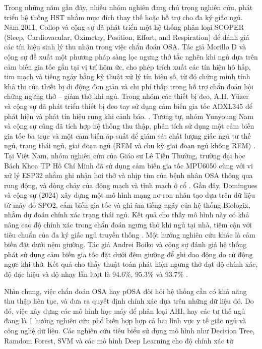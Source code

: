 Trong những năm gần đây, nhiều nhóm nghiên đang chú trọng nghiên cứu, phát triển hệ thống HST nhằm mục đích thay thế hoặc hỗ trợ cho đa ký giấc ngủ. Năm 2011, Collop và cộng sự đã phát triển một hệ thống phân loại SCOPER (Sleep, Cardiovacular, Oximetry, Position, Effort, and Respiration) để đánh giá các tín hiệu sinh lý thu nhận trong việc chẩn đoán OSA\cite{hst_6p_paper}. Tác giả Morillo D và cộng sự đề xuất một phương pháp sàng lọc ngưng thở tắc nghẽn khi ngủ dựa trên cảm biến gia tốc gắn tại vị trí hõm ức, cho phép trích xuất các tín hiệu hô hấp, tim mạch và tiếng ngáy bằng kỹ thuật xử lý tín hiệu số, từ đó chứng minh tính khả thi của thiết bị di động đơn giản và chi phí thấp trong hỗ trợ chẩn đoán hội chứng ngưng thở – giảm thở khi ngủ\cite{morillo2010accelerometer}. Trong nhóm các thiết bị đeo, A.H. Yüzer và cộng sự đã phát triển thiết bị đeo tay sử dụng cảm biến gia tốc ADXL345 để phát hiện và phát tín hiệu rung khi cảnh báo. \cite{hst_wear_paper}. Tương tự, nhóm Yunyoung Nam và cộng sự cũng đã tích hợp hệ thống thu thập, phân tích sử dụng một cảm biến gia tốc ba trục và một cảm biến áp suất để giám sát chất lượng giấc ngủ tư thế ngủ, trạng thái ngủ, giai đoạn ngủ (REM và chu kỳ giai đoạn ngủ không REM) \cite{hst_pressure_paper}. Tại Việt Nam, nhóm nghiên cứu của  Giáo sư Lê Tiến Thường, trường đại học Bách Khoa TP Hồ Chí Minh đã sử dụng cảm biến gia tốc MPU6050 cùng với vi xử lý ESP32 nhằm ghi nhận hơi thở và nhịp tim của bệnh nhân OSA thông qua rung động, và dòng chảy của động mạch và tĩnh mạch ở cổ \cite{thuong_wear_paper}. Gần đây, Domingues và cộng sự (2024) xây dựng một mô hình mạng nơ-ron nhân tạo dựa trên dữ liệu từ máy đo SPO2, cấm biến gia tốc và ghi âm tiếng ngáy của hệ thống Biologix, nhằm dự đoán chính xác trạng thái ngủ. Kết quả cho thấy mô hình này có khả nâng cao độ chính xác trong chẩn đoán ngưng thở khi ngủ tại nhà, tiệm cận với tiêu chuẩn của đa ký giấc ngủ truyền thống \cite{domingues2024sleep}. Một hướng nghiên cứu khác là cảm biến đặt dưới nệm giường. Tác giả Andrei Boiko và cộng sự đánh giá hệ thống phát sử dụng cảm biến gia tốc đặt dưới đệm giường để ghi dao động do cử động ngực khi thở. Kết quả cho thấy thuật toán phát hiện ngưng thở đạt độ chính xác, độ đặc hiệu và độ nhạy lần lượt là 94.6\%, 95.3\% và 93.7\% \cite{Boiko2023}. 

Nhìn chung, việc chẩn đoán OSA hay pOSA đòi hỏi hệ thống cần có khả năng thu thập liên tục, và đưa ra quyết định chính xác dựa trên những dữ liệu đó. Do đó, việc xây dựng các mô hình học máy để phân loại AHI, hay các tư thế ngủ đang là 1 hướng nghiên cứu phổ biến hợp hợp cả hai lĩnh vực y tế giấc ngủ và công nghệ dữ liệu. Các nghiên cứu tiêu biểu sử dụng mô hình như Decision Tree, Ramdom Forest, SVM và các mô hình Deep Learning cho độ chính xác từ 



